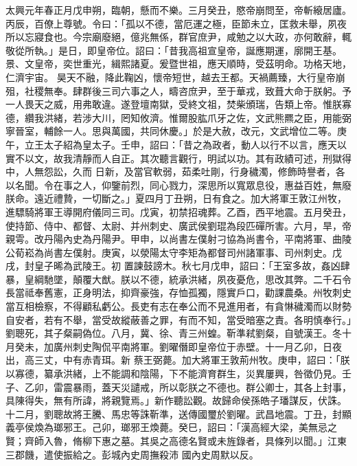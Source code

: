 \begin{pinyinscope}
 太興元年春正月戊申朔，臨朝，懸而不樂。三月癸丑，愍帝崩問至，帝斬縗居廬。丙辰，百僚上尊號。令曰：「孤以不德，當厄運之極，臣節未立，匡救未舉，夙夜所以忘寢食也。今宗廟廢絕，億兆無係，群官庶尹，咸勉之以大政，亦何敢辭，輒敬從所執。」是日，即皇帝位。詔曰：「昔我高祖宣皇帝，誕應期運，廓開王基。景、文皇帝，奕世重光，緝熙諸夏。爰暨世祖，應天順時，受茲明命。功格天地，仁濟宇宙。
 昊天不融，降此鞠凶，懷帝短世，越去王都。天禍薦臻，大行皇帝崩殂，社稷無奉。肆群後三司六事之人，疇咨庶尹，至于華戎，致葺大命于朕躬。予一人畏天之威，用弗敢違。遂登壇南獄，受終文祖，焚柴頒瑞，告類上帝。惟朕寡德，纘我洪緒，若涉大川，罔知攸濟。惟爾股肱爪牙之佐，文武熊羆之臣，用能弼寧晉室，輔餘一人。思與萬國，共同休慶。」於是大赦，改元，文武增位二等。庚午，立王太子紹為皇太子。壬申，詔曰：「昔之為政者，動人以行不以言，應天以實不以文，故我清靜而人自正。其次聽言觀行，明試以功。其有政績可述，刑獄得中，人無怨訟，久而
 日新，及當官軟弱，茹柔吐剛，行身穢濁，修飾時譽者，各以名聞。令在事之人，仰鑒前烈，同心戮力，深思所以寬眾息役，惠益百姓，無廢朕命。遠近禮贄，一切斷之。」夏四月丁丑朔，日有食之。加大將軍王敦江州牧，進驃騎將軍王導開府儀同三司。戊寅，初禁招魂葬。乙酉，西平地震。五月癸丑，使持節、侍中、都督、太尉、并州刺史、廣武侯劉琨為段匹磾所害。六月，旱，帝親雩。改丹陽內史為丹陽尹。甲申，以尚書左僕射刁協為尚書令，平南將軍、曲陵公荀崧為尚書左僕射。庚寅，以滎陽太守李矩為都督司州諸軍事、司州刺史。戊戌，封皇子晞為武陵王。初
 置諫鼓謗木。秋七月戊申，詔曰：「王室多故，姦凶肆暴，皇綱馳墜，顛覆大猷。朕以不德，統承洪緒，夙夜憂危，思改其弊。二千石令長當祗奉舊憲，正身明法，抑齊豪強，存恤孤獨，隱實戶口，勸課農桑。州牧刺史當互相檢察，不得顧私虧公。長吏有志在奉公而不見進用者，有貪惏穢濁而以財勢自安者，若有不舉，當受故縱蔽善之罪，有而不知，當受暗塞之責。各明慎奉行。」劉聰死，其子粲嗣偽位。八月，冀、徐、青三州蝗。靳準弒劉粲，自號漢王。冬十月癸未，加廣州刺史陶侃平南將軍。劉曜僭即皇帝位于赤壁。十一月乙卯，日夜出，高三丈，中有赤青珥。新
 蔡王弼薨。加大將軍王敦荊州牧。庚申，詔曰：「朕以寡德，纂承洪緒，上不能調和陰陽，下不能濟育群生，災異屢興，咎徵仍見。壬子、乙卯，雷震暴雨，蓋天災譴戒，所以彰朕之不德也。群公卿士，其各上封事，具陳得失，無有所諱，將親覽焉。」新作聽訟觀。故歸命侯孫皓子璠謀反，伏誅。十二月，劉聰故將王騰、馬忠等誅靳準，送傳國璽於劉曜。武昌地震。丁丑，封顯義亭侯煥為瑯邪王。己卯，瑯邪王煥薨。癸巳，詔曰：「漢高經大梁，美無忌之賢；齊師入魯，脩柳下惠之墓。其吳之高德名賢或未旌錄者，具條列以聞。」江東三郡饑，遣使振給之。彭城內史周撫殺沛
 國內史周默以反。




\end{pinyinscope}
